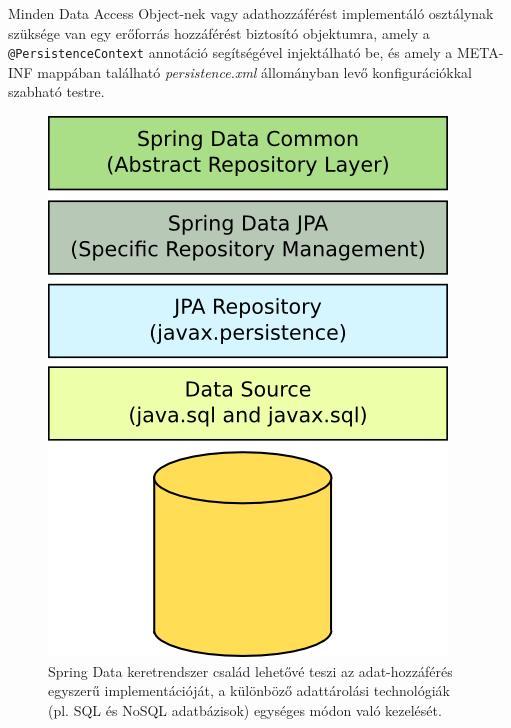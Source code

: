 Minden Data Access Object-nek vagy adathozzáférést implementáló osztálynak szüksége van egy erőforrás hozzáférést biztosító objektumra, amely a \texttt{@PersistenceContext} annotáció segítségével injektálható be, és amely a META-INF mappában található \textit{persistence.xml} állományban levő konfigurációkkal szabható testre.


 \begin{figure}
  \centering
  \includegraphics[height=0.5\linewidth]{images/SpringDataJPA}
  \caption{ \protect\footnotemark Spring Data keretrendszer család  lehetővé teszi az adat-hozzáférés egyszerű implementációját, a különböző adattárolási technológiák (pl. SQL és NoSQL adatbázisok) egységes módon való kezelését.}
  \label{fig:SpringDataJPA}
\end{figure}

